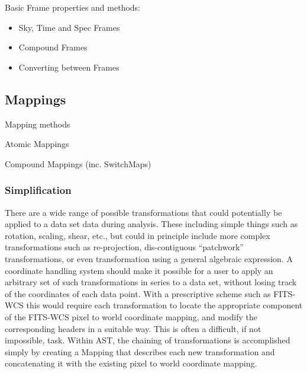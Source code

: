 \documentclass[final,authoryear,5p,times,twocolumn]{elsarticle}
\begin{document}
Basic Frame properties and methods:

\begin{itemize}
\item Sky, Time and Spec Frames
\item Compound Frames
\item Converting between Frames
\end{itemize}

\subsection{Mappings}

Mapping methods

Atomic Mappings

Compound Mappings (inc. SwitchMaps)

\subsubsection{Simplification}

There are a wide range of possible transformations that could
potentially be applied to a data set data during analysis. These
including simple things such as rotation, scaling, shear, etc., but
could in principle include more complex transformations such as
re-projection, dis-contiguous ``patchwork'' transformations, or even
transformation using a general algebraic expression.  A coordinate
handling system should make it possible for a user to apply an
arbitrary set of such transformations in series to a data set, without
losing track of the coordinates of each data point. With a
prescriptive scheme such as FITS-WCS this would require each
transformation to locate the appropriate component of the FITS-WCS
pixel to world coordinate mapping, and modify the corresponding
headers in a suitable way. This is often a difficult, if not
impossible, task. Within AST, the chaining of transformations is
accomplished simply by creating a Mapping that describes each new
transformation and concatenating it with the existing pixel to world
coordinate mapping.
\end{document}
